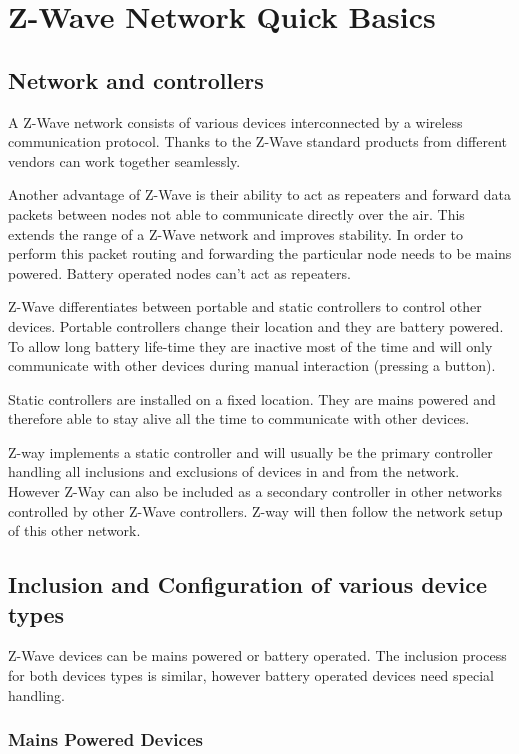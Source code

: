\section {Z-Wave Network Quick Basics}

\subsection{Network and controllers}

A Z-Wave network consists of various devices interconnected by a wireless communication protocol. Thanks to the 
Z-Wave standard products from different vendors can work together seamlessly. 

Another advantage of Z-Wave is their ability to act as repeaters and forward data packets between nodes 
not able to communicate directly over the air. This extends the range of a Z-Wave network and improves 
stability. In order to perform this packet routing and forwarding the particular node needs to be mains 
powered. Battery operated nodes can’t act as repeaters.

Z-Wave differentiates between portable and static controllers to control other devices. Portable 
controllers change their location and they are battery powered. To allow long battery life-time 
they are inactive most of the time and will only communicate with other devices during manual 
interaction (pressing a button). 

Static controllers are installed on a fixed location. They are mains powered and therefore able to 
stay alive all the time to communicate with other devices. 

Z-way implements a static controller and will usually be the primary controller handling all inclusions 
and exclusions of devices in and from the network.  However Z-Way can also be included as a secondary 
controller in other networks controlled by other Z-Wave controllers. Z-way will then follow the network 
setup of this other network.


\subsection{Inclusion and Configuration of various device types}

Z-Wave devices can be mains powered or battery operated.  The inclusion process for both devices types is 
similar, however battery operated devices need special handling.

\subsubsection{Mains Powered Devices}

